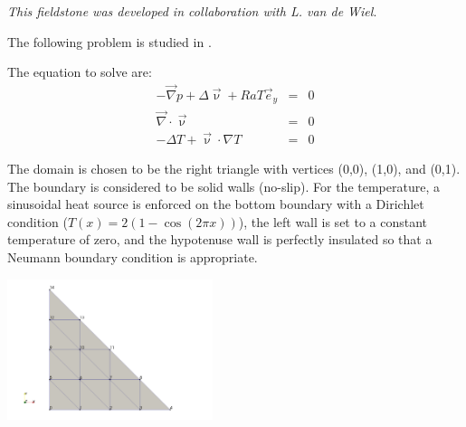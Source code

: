 {\sl This fieldstone was developed in collaboration with L. van de Wiel}. 


The following problem is studied in \cite{jolm17}.

The equation to solve are:
\begin{eqnarray}
-\vec{\nabla}p + \Delta \vec{\upnu} + Ra T \vec{e}_y &=& 0\\
\vec\nabla\cdot\vec\upnu &=& 0 \\
-\Delta T + \vec\upnu\cdot\nabla T &=& 0
\end{eqnarray}

The domain is chosen to be the right triangle
with vertices (0,0), (1,0), and (0,1). 
The boundary is considered to be solid walls (no-slip).
For the temperature, a sinusoidal heat source is enforced on the bottom
boundary with a Dirichlet condition ($T(x)=2(1-\cos (2\pi x))$), 
the left wall is set to a constant temperature
of zero, and the hypotenuse wall is perfectly insulated so that a Neumann 
boundary condition is appropriate.

\begin{center}
\includegraphics[width=6cm]{python_codes/fieldstone_51/minigrid5}
\end{center}


